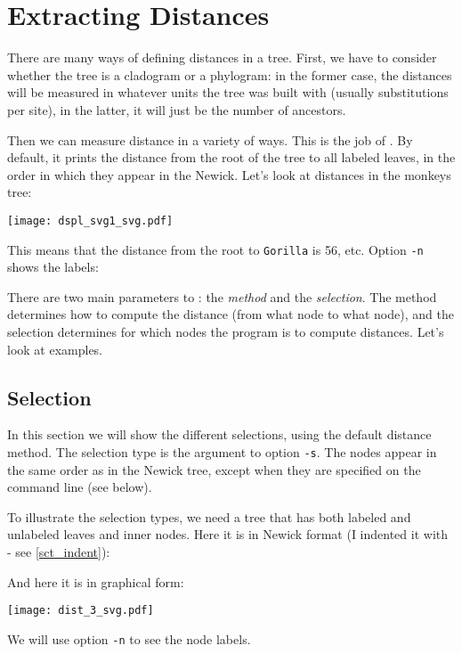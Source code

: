 \section{Extracting Distances}

There are many ways of defining distances in a tree. First, we have to consider
whether the tree is a cladogram or a phylogram: in the former case, the
distances will be measured in whatever units the tree was built with (usually
substitutions per site), in the latter, it will just be the number of ancestors.

Then we can measure distance in a variety of ways. This is the job of
\distance. By default, it prints the distance from the root of the tree to all
labeled leaves, in the order in which they appear in the Newick. Let's look at
distances in the monkeys tree:

\begin{center}
\texttt{[image: dspl\_svg1\_svg.pdf]}
\end{center}


\begin{samepage}

\end{samepage}
This means that the distance from the root to \texttt{Gorilla} is 56, etc. Option \texttt{-n} shows the labels:

\begin{samepage}

\end{samepage}

There are two main parameters to \distance: the \emph{method} and the
\emph{selection}. The method determines how to compute the distance (from what
node to what node), and the selection determines for which nodes the program is
to compute distances. Let's look at examples.

\subsection{Selection}

In this section we will show the different selections, using the default
distance method. The selection type is the argument to option \texttt{-s}.
The nodes appear in the same order as in the Newick tree, except when they are
specified on the command line (see below).

To illustrate the selection types, we need a tree that has both labeled and
unlabeled leaves and inner nodes. Here it is in Newick format (I indented it
with \nwindent{} - see \ref{sct_indent}):

And here it is in graphical form:
\begin{center}
\texttt{[image: dist\_3\_svg.pdf]}
\end{center}
We will use option \texttt{-n} to see the node labels.

